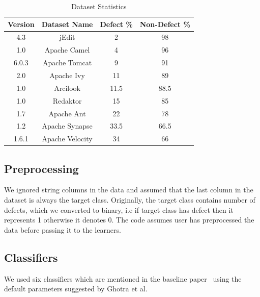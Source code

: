 \documentclass[sigconf,review, anonymous]{acmart}
\theoremstyle{break}
\theoremstyle{break}
\begin{document}
 \begin{table}[!htbp]
\begin{center}
\begin{tabular}{|c|c|c|c|}
\hline 
\textbf{Version} & \textbf{Dataset Name} &  \textbf{Defect \%} & \textbf{Non-Defect \%}\\[0.5ex]
\hline
4.3 & jEdit & 2 & 98 \\
\hline
1.0 & Apache Camel & 4 & 96 \\ 
\hline
6.0.3 & Apache Tomcat & 9 & 91 \\
\hline
2.0 & Apache Ivy & 11 & 89 \\ 
\hline
1.0 & Arcilook & 11.5 & 88.5\\
\hline
1.0 & Redaktor & 15 & 85 \\
\hline
1.7 & Apache Ant & 22 & 78 \\ 
\hline
1.2 & Apache Synapse & 33.5 & 66.5 \\
\hline
1.6.1 & Apache Velocity & 34 & 66 \\
\hline
\end{tabular}
\end{center}
\caption{Dataset Statistics}
\label{tb:dataset}
\end{table}

\subsection{\textbf{Preprocessing}}
 We ignored  string columns in the data and assumed that the last column in the dataset is always the target class. Originally, the target class contains number of defects, which we converted to binary, i.e if target class has defect then it represents 1 otherwise it denotes 0. The code assumes user has preprocessed the data before passing it to the learners. 

\subsection{\textbf{Classifiers}}
\label{sect:classes}

We used six classifiers which are mentioned in the baseline paper~\cite{ghotra2015revisiting}
using the default
parameters  suggested by Ghotra et al.
\end{document}
